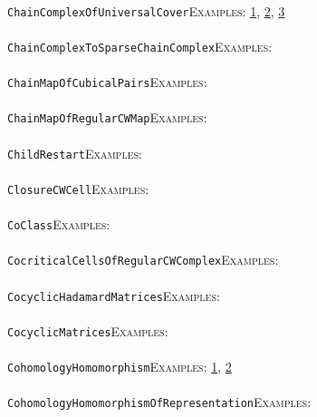 \documentclass[a4paper,11pt]{report}
\begin{document}
{{ \\
 \texttt{ChainComplexOfUniversalCover}{\nobreakspace}{\nobreakspace}{\nobreakspace}{\nobreakspace}\textsc{Examples:} \href{tutorial/chap3.html} {1}{\nobreakspace}, \href{../www/SideLinks/About/aboutCoveringSpaces.html} {2}{\nobreakspace}, \href{../www/SideLinks/About/aboutCoverinSpaces.html} {3}{\nobreakspace} \\
 \\
 \texttt{ChainComplexToSparseChainComplex}{\nobreakspace}{\nobreakspace}{\nobreakspace}{\nobreakspace}\textsc{Examples:} \\
 \\
 \texttt{ChainMapOfCubicalPairs}{\nobreakspace}{\nobreakspace}{\nobreakspace}{\nobreakspace}\textsc{Examples:} \\
 \\
 \texttt{ChainMapOfRegularCWMap}{\nobreakspace}{\nobreakspace}{\nobreakspace}{\nobreakspace}\textsc{Examples:} \\
 \\
 \texttt{ChildRestart}{\nobreakspace}{\nobreakspace}{\nobreakspace}{\nobreakspace}\textsc{Examples:} \\
 \\
 \texttt{ClosureCWCell}{\nobreakspace}{\nobreakspace}{\nobreakspace}{\nobreakspace}\textsc{Examples:} \\
 \\
 \texttt{CoClass}{\nobreakspace}{\nobreakspace}{\nobreakspace}{\nobreakspace}\textsc{Examples:} \\
 \\
 \texttt{CocriticalCellsOfRegularCWComplex}{\nobreakspace}{\nobreakspace}{\nobreakspace}{\nobreakspace}\textsc{Examples:} \\
 \\
 \texttt{CocyclicHadamardMatrices}{\nobreakspace}{\nobreakspace}{\nobreakspace}{\nobreakspace}\textsc{Examples:} \\
 \\
 \texttt{CocyclicMatrices}{\nobreakspace}{\nobreakspace}{\nobreakspace}{\nobreakspace}\textsc{Examples:} \\
 \\
 \texttt{CohomologyHomomorphism}{\nobreakspace}{\nobreakspace}{\nobreakspace}{\nobreakspace}\textsc{Examples:} \href{tutorial/chap10.html} {1}{\nobreakspace}, \href{../www/SideLinks/About/aboutCoefficientSequence.html} {2}{\nobreakspace} \\
 \\
 \texttt{CohomologyHomomorphismOfRepresentation}{\nobreakspace}{\nobreakspace}{\nobreakspace}{\nobreakspace}\textsc{Examples:} \\
}}
\end{document}
